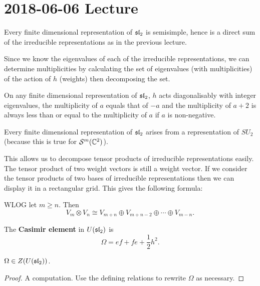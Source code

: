 \section{2018-06-06 Lecture}

\begin{thm}\label{24:thm}
  Every finite dimensional representation of $\operatorname{\mathfrak{sl}}_2$ is semisimple, hence is a direct sum of the irreducible representations as in the previous lecture.
\end{thm}

Since we know the eigenvalues of each of the irreducible representations, we can determine multiplicities by calculating the set of eigenvalues (with multiplicities) of the action of $h$ (weights) then decomposing the set.

\begin{cor}
  On any finite dimensional representation of $\operatorname{\mathfrak{sl}}_2$, $h$ acts diagonalisably with integer eigenvalues, the multiplicity of $a$ equals that of $-a$ and the multiplicity of $a+2$ is always less than or equal to the multiplicity of $a$ if $a$ is non-negative.
\end{cor}

\begin{cor}
  Every finite dimensional representation of $\operatorname{\mathfrak{sl}}_2$ arises from a representation of $SU_2$ (because this is true for $\mathcal{S}^m(\mathbb{C}^2)$).
\end{cor}

This allows us to decompose tensor products of irreducible representations easily.
The tensor product of two weight vectors is still a weight vector.
If we consider the tensor products of two bases of irreducible representations then we can display it in a rectangular grid.
This gives the following formula:

\begin{cor}
  WLOG let $m \geq n$.
  Then
  \[ V_m \otimes V_n \cong V_{m+n} \oplus V_{m+n-2} \oplus \cdots \oplus V_{m-n}. \]
\end{cor}

\begin{defn}
  The \textbf{Casimir element} in $U(\operatorname{\mathfrak{sl}}_2)$ is
  \[ \Omega = ef+fe+\frac 12 h^2. \]
\end{defn}

\begin{prop}
  $\Omega \in Z(U(\operatorname{\mathfrak{sl}}_2))$.
\end{prop}

\begin{proof}
  A computation.
  Use the defining relations to rewrite $\Omega$ as necessary.
\end{proof}

